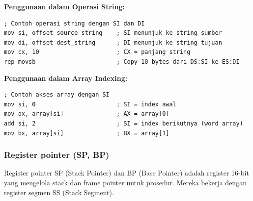 \documentclass[../main.tex]{subfiles}
\begin{document}
\textbf{Penggunaan dalam Operasi String:}
\begin{lstlisting}[language={[x86masm]Assembler}, caption=Operasi String dengan SI dan DI, label=lst:string-operations]
; Contoh operasi string dengan SI dan DI
mov si, offset source_string    ; SI menunjuk ke string sumber
mov di, offset dest_string      ; DI menunjuk ke string tujuan
mov cx, 10                      ; CX = panjang string
rep movsb                       ; Copy 10 bytes dari DS:SI ke ES:DI
\end{lstlisting}

\textbf{Penggunaan dalam Array Indexing:}
\begin{lstlisting}[language={[x86masm]Assembler}, caption=Akses Array dengan SI, label=lst:array-indexing]
; Contoh akses array dengan SI
mov si, 0                       ; SI = index awal
mov ax, array[si]               ; AX = array[0]
add si, 2                       ; SI = index berikutnya (word array)
mov bx, array[si]               ; BX = array[1]
\end{lstlisting}

            \subsubsection{Register pointer (SP, BP)}
Register pointer SP (Stack Pointer) dan BP (Base Pointer) adalah register 16-bit yang mengelola stack dan frame pointer untuk prosedur. Mereka bekerja dengan register segmen SS (Stack Segment).
\end{document}
